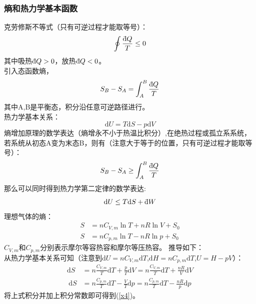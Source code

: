 \documentclass[12pt]{article}
\newcommand \dbar {{\; \bar{} \hspace{-0.3em} \mathrm d}}%
\begin{document}
\subsubsection{熵和热力学基本函数}
\noindent
克劳修斯不等式（只有可逆过程才能取等号）：
\begin{equation}
\oint{\frac{\dbar Q}{T}}\leq 0
\end{equation}
其中吸热$\dbar Q>0$，放热$\dbar Q<0$。\\
引入态函数熵，
\begin{equation}
	S_B-S_A=\int_A^B{\frac{\dbar Q}{T}}
\end{equation}
其中A,B是平衡态，积分沿任意可逆路径进行。\\
热力学基本关系：
\begin{equation}
	\mathrm{d}U=T\mathrm{d}S-p\mathrm{d}V
\end{equation}
熵增加原理的数学表达（熵增永不小于热温比积分）,在绝热过程或孤立系系统，若系统从初态A变为末态B，则有（注意大于等于的位置，只有可逆过程才能取等号）：
\begin{equation}
	S_B-S_A\geq \int_A^B{\frac{\dbar Q}{T}}
\end{equation}
那么可以同时得到热力学第二定律的数学表达:
\begin{equation}
	\mathrm{d}U\le T\mathrm{d}S+\dbar W
\end{equation}
理想气体的熵：
\begin{equation}
	\begin{split}
	S&=nC_{V,m}\ln T+nR\ln V+S_0\\
	S&=nC_{p,m}\ln T-nR\ln p+S_0
		\end{split}
	\label{x4}
\end{equation}
$C_{V,m}和C_{p,m}$分别表示摩尔等容热容和摩尔等压热容。
推导如下：\\
从热力学基本关系可知（注意到$\mathrm{d}U=nC_{V,m}\mathrm{d}T$,$\mathrm{d}H=nC_{p,m}\mathrm{d}T$,$U=H-pV$）：
\begin{equation}
	\begin{split}
		\mathrm{d}S&=n\frac{C_{V,m}}{T}\mathrm{d}T+\frac{p}{T}\mathrm{d}V
		=n\frac{C_{V,m}}{T}\mathrm{d}T+\frac{nR}{V}\mathrm{d}V\\\
		\mathrm{d}S&=n\frac{C_{p,m}}{T}\mathrm{d}T-\frac{V}{T}\mathrm{d}p
		=n\frac{C_{p,m}}{T}\mathrm{d}T-\frac{nR}{p}\mathrm{d}p
	\end{split}
\end{equation}
将上式积分并加上积分常数即可得到(\ref{x4})。
\end{document}
